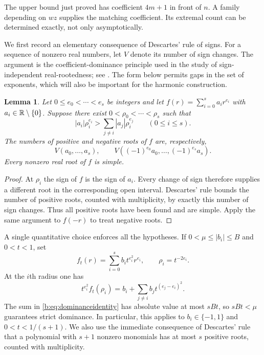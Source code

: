 \documentclass[UTF8,11pt]{ctexart}
\newtheorem{lem}[thm]{Lemma}
\theoremstyle{definition}
\numberwithin{equation}{section}
\begin{document}
The upper bound just proved has coefficient $4m+1$ in front of $n$.
A family depending on $wz$ supplies the matching coefficient. Its
extremal count can be determined exactly, not only asymptotically.

We first record an elementary consequence of Descartes' rule of
signs. For a sequence of nonzero real numbers, let $V$ denote its
number of sign changes. The argument is the coefficient-dominance
principle used in the study of sign-independent real-rootedness; see
\cite[Proposition~1 and its proof, \av, pp.~2, 9--10]{FNS17}.
The form below permits gaps in the set of exponents, which will also
be important for the harmonic construction.
\begin{lem}\label{b:lem:dominance}
Let $0\le e_0<\cdots<e_s$ be integers and let
$f(r)=\sum_{i=0}^s a_ir^{e_i}$ with $a_i\in\mathbb R\setminus\{0\}$.
Suppose there exist $0<\rho_0<\cdots<\rho_s$ such that
\[
 |a_i|\rho_i^{e_i}>
 \sum_{j\ne i}|a_j|\rho_i^{e_j}\qquad(0\le i\le s).
\]
The numbers of positive and negative roots of $f$ are, respectively,
\[
 V(a_0,\ldots,a_s),\qquad
 V((-1)^{e_0}a_0,\ldots,(-1)^{e_s}a_s).
\]
Every nonzero real root of $f$ is simple.
\end{lem}
\begin{proof}
At $\rho_i$ the sign of $f$ is the sign of $a_i$. Every change of
sign therefore supplies a different root in the corresponding open
interval. Descartes' rule bounds the number of positive roots,
counted with multiplicity, by exactly this number of sign changes.
Thus all positive roots have been found and are simple. Apply the
same argument to $f(-r)$ to treat negative roots.
\end{proof}

A single quantitative choice enforces all the hypotheses. If
$0<\mu\le|b_i|\le B$ and $0<t<1$, set
\[
 f_t(r)=\sum_{i=0}^s b_it^{e_i^2}r^{e_i},\qquad
 \rho_i=t^{-2e_i}.
\]
At the $i$th radius one has
\begin{equation}\label{b:eq:dominanceidentity}
 t^{e_i^2}f_t(\rho_i)
 =b_i+\sum_{j\ne i}b_jt^{(e_j-e_i)^2}.
\end{equation}
The sum in \eqref{b:eq:dominanceidentity} has absolute value at most
$sBt$, so $sBt<\mu$ guarantees strict dominance. In particular, this
applies to $b_i\in\{-1,1\}$ and $0<t<1/(s+1)$.
We also use the immediate consequence of Descartes' rule that a
polynomial with $s+1$ nonzero monomials has at most $s$ positive
roots, counted with multiplicity.
\end{document}
